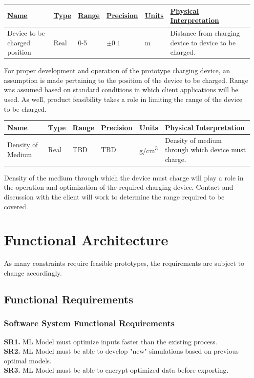 \documentclass[12pt, titlepage]{article}
\begin{document}
\begin{center}
\begin{tabular}{|p{3cm}|p{1cm}|p{1cm}|p{2cm}|p{1cm}|p{6cm}|}
\hline
\underline{Name} & \underline{Type} & \underline{Range} & \underline{Precision} & \underline{Units} & \underline{Physical Interpretation}\\[5pt]
\hline
Device to be charged position & Real & 0-5 & $\pm0.1$ & m & Distance from charging device to device to be charged.\\
\hline
\end{tabular}
\end{center}

For proper development and operation of the prototype charging device, an assumption is made pertaining to the position of the device to be charged. Range was assumed based on standard conditions in which client applications will be used. As well, product feasibility takes a role in limiting the range of the device to be charged. 

\begin{center}
\begin{tabular}{|p{3cm}|p{1cm}|p{1cm}|p{2cm}|p{1cm}|p{6cm}|}
\hline
\underline{Name} & \underline{Type} & \underline{Range} & \underline{Precision} & \underline{Units} & \underline{Physical Interpretation}\\[5pt]
\hline
Density of Medium & Real & TBD & TBD & \si[per-mode=symbol]{\gram\per\centi\meter\cubed} & Density of medium through which device must charge.\\
\hline
\end{tabular}
\end{center}

Density of the medium through which the device must charge will play a role in the operation and optimization of the required charging device. Contact and discussion with the client will work to determine the range required to be covered. 
\section{Functional Architecture}
As many constraints require feasible prototypes, the requirements are subject to change accordingly.
\subsection{Functional Requirements}
\subsubsection{Software System Functional Requirements}
\textbf{SR1.} ML Model must optimize inputs faster than the existing process.\\
\textbf{SR2.} ML Model must be able to develop "new" simulations based on previous optimal models.\\
\textbf{SR3.} ML Model must be able to encrypt optimized data before exporting.
\end{document}
